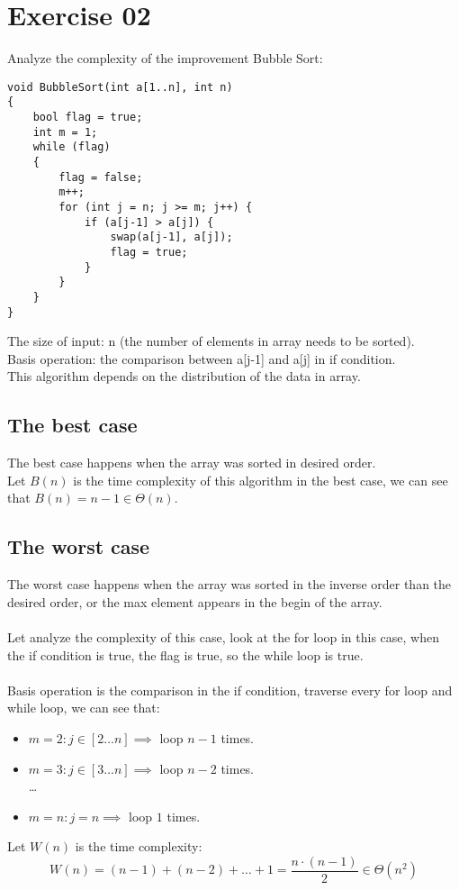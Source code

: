 \documentclass[a4paper]{article}
\begin{document}
\section{Exercise 02}
Analyze the complexity of the improvement Bubble Sort:

\begin{lstlisting}
void BubbleSort(int a[1..n], int n)
{
    bool flag = true;
    int m = 1;
    while (flag) 
    {
        flag = false;
        m++;
        for (int j = n; j >= m; j++) {
            if (a[j-1] > a[j]) {
                swap(a[j-1], a[j]);
                flag = true;
            }
        }
    }
}
\end{lstlisting}

The size of input: n (the number of elements in array needs to be sorted). \\ 
Basis operation: the comparison between a[j-1] and a[j] in if condition. \\
This algorithm depends on the distribution of the data in array.\\
\subsection{The best case}
The best case happens when the array was sorted in desired order. \\
Let $B(n)$ is the time complexity of this algorithm in the best case, we can see that $B(n) = n-1 \in \Theta(n)$.
\subsection{The worst case}
The worst case happens when the array was sorted in the inverse order than the desired order, or the max element appears in the begin of the array. \\ 
\\
Let analyze the complexity of this case, look at the for loop in this case, when the if condition is true, the flag is true, so the while loop is true. \\ 
\\
Basis operation is the comparison in the if condition, traverse every for loop and while loop, we can see that:
\begin{itemize}
    \item $m=2: j \in [2 \ldots n] \implies$ loop $n-1$ times.
    \item $m=3: j \in [3 \ldots n] \implies$ loop $n-2$ times.\\
    \ldots
    \item $m=n: j=n \implies$ loop $1$ times.
\end{itemize}
Let $W(n)$ is the time complexity:
\begin{equation*}
    W(n) = (n-1) + (n-2) + \ldots + 1 = \frac{n \cdot (n-1)}{2} \in \Theta(n^2)
\end{equation*}
\end{document}
